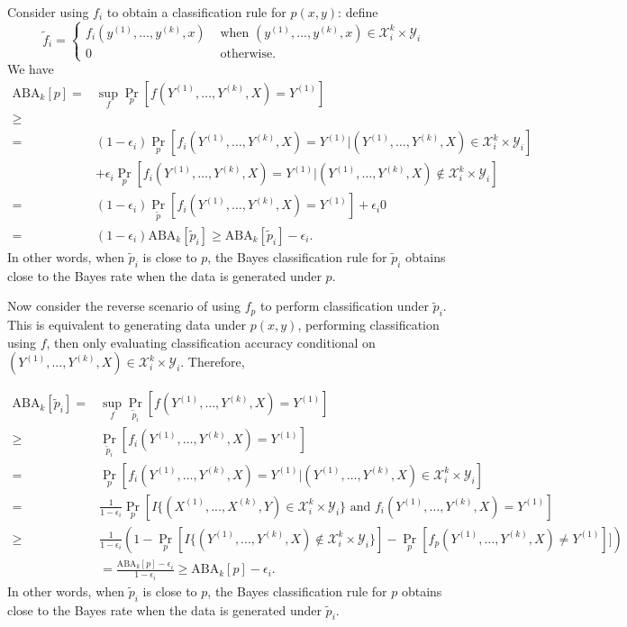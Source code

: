 Consider using $f_i$ to obtain a classification rule for $p(x, y)$:
define
\[
\tilde{f}_i = \begin{cases}f_i(y^{(1)},\hdots,y^{(k)}, x) & \text{ when } (y^{(1)},\hdots,y^{(k)}, x) \in \mathcal{X}_i^k \times \mathcal{Y}_i\\
0 & \text{ otherwise.} 
\end{cases}
\]
We have
\begin{align*}
\text{ABA}_k[p] =& \sup_f \Pr_p[f(Y^{(1)},\hdots,Y^{(k)}, X) = Y^{(1)}]
\\ \geq& 
\\=& (1-\epsilon_i)\Pr_p[f_i(Y^{(1)},\hdots,Y^{(k)}, X) = Y^{(1)}|(Y^{(1)},\hdots,Y^{(k)}, X)\in \mathcal{X}_i^k \times \mathcal{Y}_i]
\\&+ \epsilon_i \Pr_p[f_i(Y^{(1)},\hdots,Y^{(k)}, X) = Y^{(1)}|(Y^{(1)},\hdots,Y^{(k)}, X)\notin \mathcal{X}_i^k \times \mathcal{Y}_i]
\\=& (1-\epsilon_i)\Pr_{\tilde{p}}[f_i(Y^{(1)},\hdots,Y^{(k)}, X) = Y^{(1)}]
+ \epsilon_i 0
\\=& (1-\epsilon_i) \text{ABA}_k[\tilde{p}_i] \geq \text{ABA}_k[\tilde{p}_i] - \epsilon_i.
\end{align*}
In other words, when $\tilde{p}_i$ is close to $p$, the Bayes
classification rule for $\tilde{p}_i$ obtains close to the Bayes rate
when the data is generated under $p$.

Now consider the reverse scenario of using $f_p$ to perform
classification under $\tilde{p}_i$.  This is equivalent to generating
data under $p(x, y)$, performing classification using $f$, then only
evaluating classification accuracy conditional on $(Y^{(1)},...,Y^{(k)},
X)\in \mathcal{X}_i^k \times \mathcal{Y}_i$.  Therefore,

\begin{align*}
\text{ABA}_k[\tilde{p}_i] =& \sup_f \Pr_{\tilde{p}_i}[f(Y^{(1)},\hdots,Y^{(k)}, X) = Y^{(1)}]
\\\geq &  \Pr_{\tilde{p}_i}[f_i(Y^{(1)},\hdots,Y^{(k)}, X) = Y^{(1)}]
\\=& \Pr_p[f_i(Y^{(1)},\hdots,Y^{(k)}, X) = Y^{(1)}| (Y^{(1)},\hdots,Y^{(k)}, X)\in \mathcal{X}_i^k \times \mathcal{Y}_i]
\\=& \frac{1}{1-\epsilon_i} \Pr_p[I\{(X^{(1)},...,X^{(k)}, Y)\in \mathcal{X}_i^k \times \mathcal{Y}_i\} \text{ and }f_i(Y^{(1)},\hdots,Y^{(k)}, X) = Y^{(1)}]
\\\geq & \frac{1}{1-\epsilon_i} \left(1 - \Pr_p[I\{(Y^{(1)},...,Y^{(k)}, X)\notin \mathcal{X}_i^k \times \mathcal{Y}_i\}] - \Pr_p[f_p(Y^{(1)},\hdots,Y^{(k)}, X) \neq Y^{(1)}]]\right)
\\&= \frac{\text{ABA}_k[p] - \epsilon_i}{1-\epsilon_i} \geq \text{ABA}_k[p] - \epsilon_i.
\end{align*}
In other words, when $\tilde{p}_i$ is close to $p$, the Bayes
classification rule for $p$ obtains close to the Bayes rate when the
data is generated under $\tilde{p}_i$.

